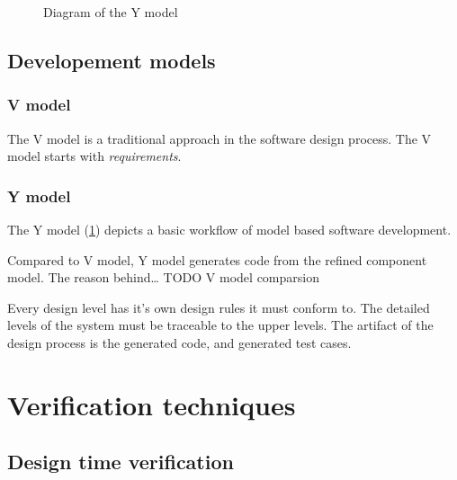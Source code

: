 \begin{figure}
	\caption{Diagram of the Y model \citep{MDSD_INTRO}}
\label{fig:y_model}%
\end{figure}

\subsection{Developement models}

\subsubsection{V model}

The V model is a traditional approach in the software design process. The V model starts with \emph{requirements}.

\subsubsection{Y model}

The Y model (\cref{fig:y_model}) depicts a basic workflow of model based software development.

Compared to V model, Y model generates code from the refined component model. The reason behind\ldots
TODO V model comparsion

Every design level has it's own design rules it must conform to. The detailed levels of the system must be traceable to the upper levels. The artifact of the design process is the generated code, and generated test cases.

\section{Verification techniques}
\label{sec:verification_techniques}

\subsection{Design time verification}


